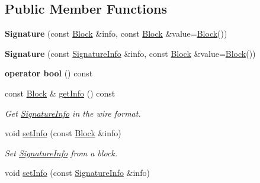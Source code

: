 \subsection*{Public Member Functions}
\begin{DoxyCompactItemize}
\item 
{\bfseries Signature} (const \hyperlink{classndn_1_1Block}{Block} \&info, const \hyperlink{classndn_1_1Block}{Block} \&value=\hyperlink{classndn_1_1Block}{Block}())\hypertarget{classndn_1_1Signature_ae79628836f4441fa28da032c3f2dea8a}{}\label{classndn_1_1Signature_ae79628836f4441fa28da032c3f2dea8a}

\item 
{\bfseries Signature} (const \hyperlink{classndn_1_1SignatureInfo}{Signature\+Info} \&info, const \hyperlink{classndn_1_1Block}{Block} \&value=\hyperlink{classndn_1_1Block}{Block}())\hypertarget{classndn_1_1Signature_aecec900eed192e4af4d7d30ba4618b9b}{}\label{classndn_1_1Signature_aecec900eed192e4af4d7d30ba4618b9b}

\item 
{\bfseries operator bool} () const\hypertarget{classndn_1_1Signature_acad3d8bcba44a2b7a34d449144c3a4f6}{}\label{classndn_1_1Signature_acad3d8bcba44a2b7a34d449144c3a4f6}

\item 
const \hyperlink{classndn_1_1Block}{Block} \& \hyperlink{classndn_1_1Signature_a2457c3d2a6d1d42a90fda0f21242a461}{get\+Info} () const\hypertarget{classndn_1_1Signature_a2457c3d2a6d1d42a90fda0f21242a461}{}\label{classndn_1_1Signature_a2457c3d2a6d1d42a90fda0f21242a461}

\begin{DoxyCompactList}\small\item\em Get \hyperlink{classndn_1_1SignatureInfo}{Signature\+Info} in the wire format. \end{DoxyCompactList}\item 
void \hyperlink{classndn_1_1Signature_afaf518c9fbe44898b20fd60a8c8e8921}{set\+Info} (const \hyperlink{classndn_1_1Block}{Block} \&info)
\begin{DoxyCompactList}\small\item\em Set \hyperlink{classndn_1_1SignatureInfo}{Signature\+Info} from a block. \end{DoxyCompactList}\item 
void \hyperlink{classndn_1_1Signature_a8b525c4b64e0e39a47ab126bfccd1430}{set\+Info} (const \hyperlink{classndn_1_1SignatureInfo}{Signature\+Info} \&info)\hypertarget{classndn_1_1Signature_a8b525c4b64e0e39a47ab126bfccd1430}{}\label{classndn_1_1Signature_a8b525c4b64e0e39a47ab126bfccd1430}


\end{DoxyCompactItemize}
